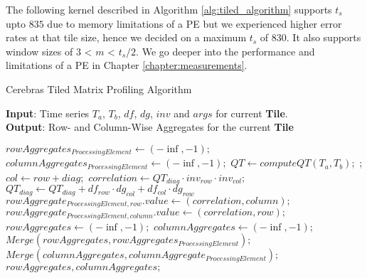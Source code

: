The following kernel described in Algorithm \ref{alg:tiled_algorithm} supports $t_s$ upto $835$ due to memory limitations of a PE but we experienced higher error rates at that tile size, hence we decided on a maximum $t_s$ of 830. It also supports window sizes of 3 < $m$ < \(t_s / 2\). We go deeper into the performance and limitations of a PE in Chapter \ref{chapter:measurements}.

\begin{algorithm}
    \caption{Cerebras Tiled Matrix Profiling Algorithm}
    \label{alg:tiled_algorithm}
    \hspace*{\algorithmicindent} \textbf{Input}: Time series $T_a$, $T_b$, $df$, $dg$, $inv$ and $args$ for current \textbf{Tile}.\\
    \hspace*{\algorithmicindent} \textbf{Output}: Row- and Column-Wise Aggregates for the current \textbf{Tile}
    \begin{algorithmic}[1]
            \State $rowAggregates_{ProcessingElement} \gets (-\inf, -1);$
            \State $columnAggregates_{ProcessingElement} \gets (-\inf, -1);$
            \State $QT \gets computeQT(T_a, T_b);$
                ;
                    \State $col \gets row + diag;$
                    \State $correlation \gets QT_{diag} \cdot inv_{row} \cdot inv_{col};$
                    \State $QT_{diag} \gets QT_{diag} + df_{row} \cdot dg_{col} + df_{col} \cdot dg_{row}$
                        \State $rowAggregate_{ProcessingElement, row}.value \gets (correlation, column);$
                    \EndIf
                        \State $rowAggregate_{ProcessingElement, column}.value \gets (correlation, row);$
                    \EndIf
                \EndFor
            \EndFor
        \EndFor
        \State $rowAggregates \gets (-\inf, -1);$
        \State $columnAggregates \gets (-\inf, -1);$
            \State $Merge(rowAggregates, rowAggregates_{ProcessingElement});$
            \State $Merge(columnAggregates, columnAggregate_{ProcessingElement});$
        \EndFor\\
        \Return $rowAggregates, columnAggregates;$
    \end{algorithmic}
    \label{alg:tiled_matrix}
\end{algorithm}

